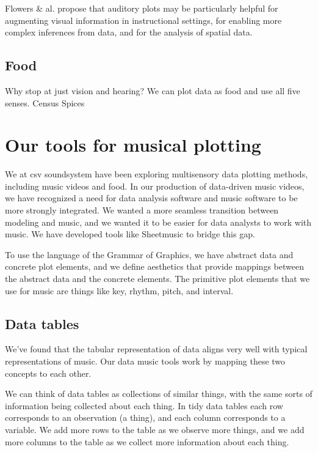 \documentclass{acm_proc_article-sp}
\begin{document}
Flowers \& al. \cite{flowers2005} propose that auditory plots may be
particularly helpful for augmenting visual information in instructional
settings, for enabling more complex inferences from data, and for
the analysis of spatial data.

\subsection{Food}
Why stop at just vision and hearing? We can plot data as food and use
all five senses.
Census Spices

\section{Our tools for musical plotting}
We at csv soundsystem \cite{csv} have been exploring multisensory
data plotting methods, including music videos and food.
In our production of data-driven music videos, we have recognized a need
for data analysis software and music software to be more strongly integrated.
We wanted a more seamless transition between modeling and music, and we
wanted it to be easier for data analysts to work with music. We have
developed tools like Sheetmusic to bridge this gap.

To use the language of the Grammar of Graphics, \cite{XXX}
we have abstract data and concrete plot elements,
and we define aesthetics that provide mappings
between the abstract data and the concrete elements.
The primitive plot elements that we use for music are things
like key, rhythm, pitch, and interval.

\subsection{Data tables}
We've found that the tabular representation of data aligns very well with
typical representations of music. Our data music tools work by mapping these
two concepts to each other.

We can think of data tables as collections of similar things, with the
same sorts of information being collected about each thing. In tidy data
tables \cite{tidydata} each row corresponds to an observation (a thing),
and each column corresponds to a variable. We add more rows to the table
as we observe more things, and we add more columns to the table as we
collect more information about each thing.
\end{document}
